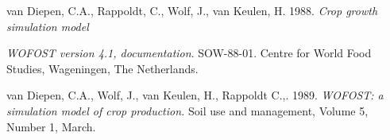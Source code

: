 van Diepen, C.A., Rappoldt, C., Wolf, J., van Keulen, H. 1988. {\it Crop growth simula\-tion model \/}

{\it WOFOST version 4.1, documentation\/}. SOW-88-01. Centre for World
Food Studies, Wage\-ningen, The Netherlands.

van Diepen, C.A., Wolf, J., van Keulen, H., Rappoldt C.,. 1989. {\it WOFOST: a simula\-tion 
model of crop production. \/}Soil use and management, Volume 5, Number 1, March.
